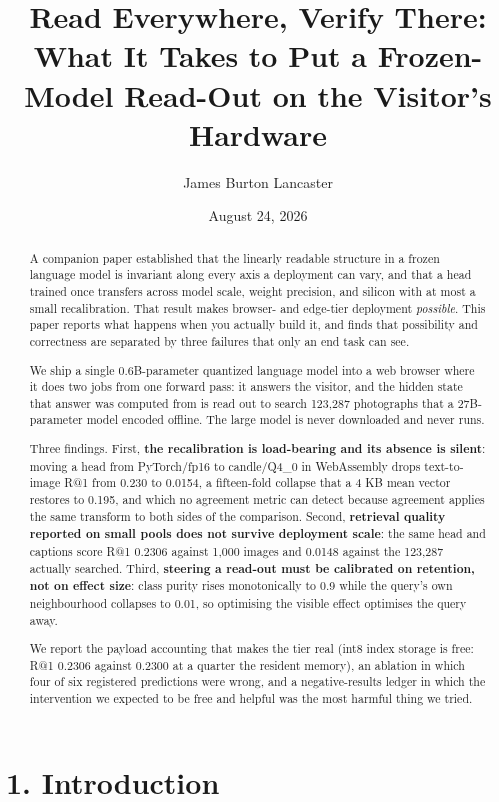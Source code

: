 \documentclass[
  11pt,
]{article}
\title{Read Everywhere, Verify There: What It Takes to Put a
Frozen-Model Read-Out on the Visitor's Hardware}
\author{James Burton Lancaster}
\date{August 24, 2026}
\begin{document}
\maketitle
\begin{abstract}
A companion paper established that the linearly readable structure in a
frozen language model is invariant along every axis a deployment can
vary, and that a head trained once transfers across model scale, weight
precision, and silicon with at most a small recalibration. That result
makes browser- and edge-tier deployment \emph{possible}. This paper
reports what happens when you actually build it, and finds that
possibility and correctness are separated by three failures that only an
end task can see.

We ship a single 0.6B-parameter quantized language model into a web
browser where it does two jobs from one forward pass: it answers the
visitor, and the hidden state that answer was computed from is read out
to search 123,287 photographs that a 27B-parameter model encoded
offline. The large model is never downloaded and never runs.

Three findings. First, \textbf{the recalibration is load-bearing and its
absence is silent}: moving a head from PyTorch/fp16 to candle/Q4\_0 in
WebAssembly drops text-to-image R@1 from 0.230 to 0.0154, a fifteen-fold
collapse that a 4 KB mean vector restores to 0.195, and which no
agreement metric can detect because agreement applies the same transform
to both sides of the comparison. Second, \textbf{retrieval quality
reported on small pools does not survive deployment scale}: the same
head and captions score R@1 0.2306 against 1,000 images and 0.0148
against the 123,287 actually searched. Third, \textbf{steering a
read-out must be calibrated on retention, not on effect size}: class
purity rises monotonically to 0.9 while the query's own neighbourhood
collapses to 0.01, so optimising the visible effect optimises the query
away.

We report the payload accounting that makes the tier real (int8 index
storage is free: R@1 0.2306 against 0.2300 at a quarter the resident
memory), an ablation in which four of six registered predictions were
wrong, and a negative-results ledger in which the intervention we
expected to be free and helpful was the most harmful thing we tried.
\end{abstract}

\section{1. Introduction}\label{introduction}
\end{document}
